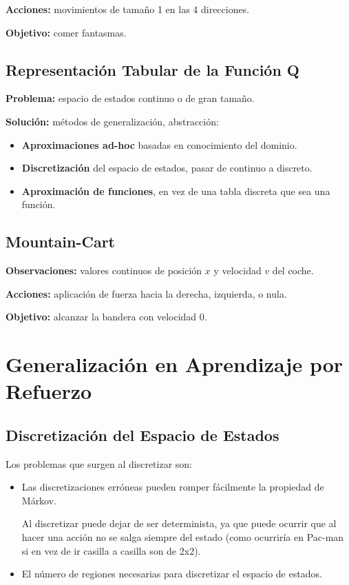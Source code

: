 \documentclass[12pt, twoside, openright]{report} %
\begin{document}
\textbf{Acciones:} movimientos de tamaño 1 en las 4 direcciones.

\textbf{Objetivo:} comer fantasmas.

\subsection{Representación Tabular de la Función Q}
\textbf{Problema:} espacio de estados continuo o de gran tamaño.

\textbf{Solución:} métodos de generalización, abstracción:
\begin{itemize}
	\item \textbf{Aproximaciones ad-hoc} basadas en conocimiento del dominio.
	\item \textbf{Discretización} del espacio de estados, pasar de continuo a discreto.
	\item \textbf{Aproximación de funciones}, en vez de una tabla discreta que sea una función.
\end{itemize}

\subsection{Mountain-Cart}
\textbf{Observaciones:} valores continuos de posición $x$ y velocidad $v$ del coche.

\textbf{Acciones:} aplicación de fuerza hacia la derecha, izquierda, o nula.

\textbf{Objetivo:} alcanzar la bandera con velocidad 0.

\section{Generalización en Aprendizaje por Refuerzo}
\subsection{Discretización del Espacio de Estados}
Los problemas que surgen al discretizar son:
\begin{itemize}
	\item Las discretizaciones erróneas pueden romper fácilmente la propiedad de Márkov.

	      Al discretizar puede dejar de ser determinista, ya que puede ocurrir que al hacer una acción no se salga siempre del estado (como ocurriría en Pac-man si en vez de ir casilla a casilla son de 2x2).
	\item El número de regiones necesarias para discretizar el espacio de estados.
\end{itemize}
\end{document}
